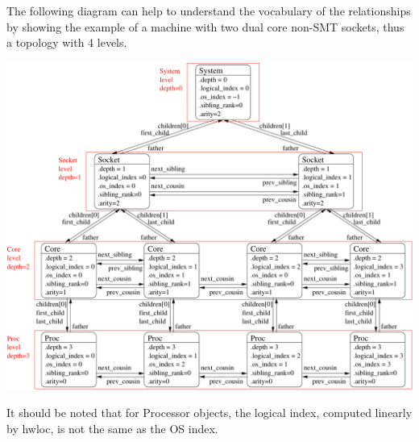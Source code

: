 The following diagram can help to understand the vocabulary of the relationships by showing the example of a machine with two dual core non-\/SMT sockets, thus a topology with 4 levels.

 
\begin{DoxyImageNoCaption}
  \mbox{\includegraphics[width=\textwidth]{diagram}}
\end{DoxyImageNoCaption}


It should be noted that for Processor objects, the logical index, computed linearly by hwloc, is not the same as the OS index. 
